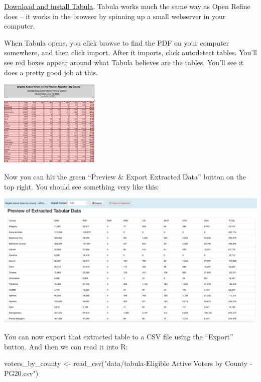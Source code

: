 \documentclass[
  letterpaper,
  DIV=11,
  numbers=noendperiod]{scrreprt}
\newenvironment{Shaded}{\begin{snugshade}}{\end{snugshade}}
\newcommand{\FunctionTok}[1]{\textcolor[rgb]{0.28,0.35,0.67}{#1}}
\newcommand{\NormalTok}[1]{\textcolor[rgb]{0.00,0.23,0.31}{#1}}
\newcommand{\OtherTok}[1]{\textcolor[rgb]{0.00,0.23,0.31}{#1}}
\newcommand{\StringTok}[1]{\textcolor[rgb]{0.13,0.47,0.30}{#1}}
\begin{document}
\href{https://tabula.technology/}{Download and install Tabula}. Tabula
works much the same way as Open Refine does -- it works in the browser
by spinning up a small webserver in your computer.

When Tabula opens, you click browse to find the PDF on your computer
somewhere, and then click import. After it imports, click autodetect
tables. You'll see red boxes appear around what Tabula believes are the
tables. You'll see it does a pretty good job at this.

\includegraphics[width=1.89in,height=\textheight]{./images/md_voters.png}

Now you can hit the green ``Preview \& Export Extracted Data'' button on
the top right. You should see something very like this:

\includegraphics[width=5.4in,height=\textheight]{./images/md_voters2.png}

You can now export that extracted table to a CSV file using the
``Export'' button. And then we can read it into R:

\begin{Shaded}
\begin{Highlighting}[]
\NormalTok{voters\_by\_county }\OtherTok{\textless{}{-}} \FunctionTok{read\_csv}\NormalTok{(}\StringTok{"data/tabula{-}Eligible Active Voters by County {-} PG20.csv"}\NormalTok{)}
\end{Highlighting}
\end{Shaded}
\end{document}
